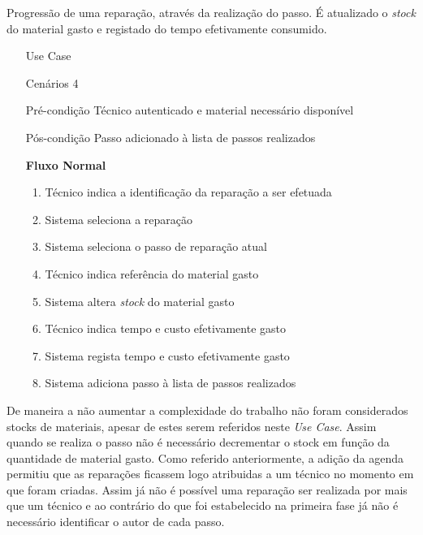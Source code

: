 \documentclass[../relatorio.tex]{subfiles}
\begin{document}
Progressão de uma reparação, através da realização do passo.
É atualizado o \textit{stock} do material gasto e registado do tempo efetivamente consumido.
\begin{itemize}
    \item[Use Case] {\underline{}}
    \item[Cenários] {4}
    \item[Pré-condição] {Técnico autenticado e material necessário disponível}
    \item[Pós-condição] {Passo adicionado à lista de passos realizados}
          \begin{flushleft}
              \textbf{Fluxo Normal}
          \end{flushleft}
          \begin{enumerate}
              \item Técnico indica a identificação da reparação a ser efetuada 
              \item Sistema seleciona a reparação
              \item Sistema seleciona o passo de reparação atual
              \item Técnico indica referência do material gasto
              \item Sistema altera \textit{stock} do material gasto
              \item Técnico indica tempo e custo efetivamente gasto 
              \item Sistema regista tempo e custo efetivamente gasto
              \item Sistema adiciona passo à lista de passos realizados
          \end{enumerate}
\end{itemize}

De maneira a não aumentar a complexidade do trabalho não foram considerados stocks de materiais, apesar de estes serem referidos neste \textit{Use Case}.
Assim quando se realiza o passo não é necessário decrementar o stock em função da quantidade de material gasto.
Como referido anteriormente, a adição da agenda permitiu que as reparações ficassem logo atribuidas a um técnico no momento em que foram criadas. Assim
já não é possível uma reparação ser realizada por mais que um técnico e ao contrário do que foi estabelecido na primeira fase já não é necessário identificar 
o autor de cada passo.
\end{document}
